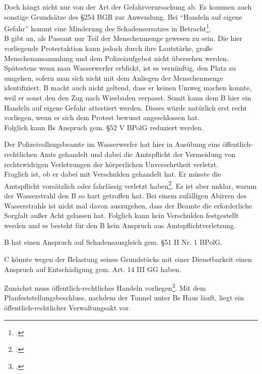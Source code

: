 \documentclass[widefront, ngerman]{jura}
\begin{document}
Doch hängt nicht nur von der Art der Gefahrverursachung ab. Es kommen auch sonstige Grundsätze des §254 BGB zur Anwendung. Bei "`Handeln auf eigene Gefahr"' kommt eine Minderung des Schadensersatzes in Betracht\footcite[§254 Rn 62]{Staudinger254}.\\
B gibt an, als Passant nur Teil der Menschenmenge gewesen zu sein. Die hier vorliegende Protestaktion kann jedoch durch ihre Lautstärke, große Menschenansammlung und dem Polizeiaufgebot nicht übersehen werden. Spätestens wenn man Wasserwerfer erblickt, ist es vernünftig, den Platz zu umgehen, sofern man sich nicht mit dem Anliegen der Menschenmenge identifiziert. B macht auch nicht geltend, dass er keinen Umweg machen konnte, weil er sonst den den Zug nach Wiesbaden verpasst. Somit kann dem B hier ein Handeln auf eigene Gefahr attestiert werden. Dieses würde natürlich erst recht vorliegen, wenn er sich dem Protest bewusst angeschlossen hat.\\
Folglich kann Bs Anspruch gem. §52 V BPolG reduziert werden.


\levelup {}
Der Polizeivollzugsbeamte im Wasserwerfer hat hier in Ausübung eins öffentlich-rechtlichen Amts gehandelt und dabei die Amtspflicht der Vermeidung von rechtswidrigen Verletzungen der körperlichen Unversehrtheit verletzt.\\
Fraglich ist, ob er dabei mit Verschulden gehandelt hat. Er müsste die Amtspflicht vorsätzlich oder fahrlässig verletzt haben\footcite[Rachor][L Rn 91]{HandbuchPolizeirecht}. Es ist aber unklar, warum der Wasserstrahl den B so hart getroffen hat. Bei einem zufälligen Abirren des Wasserstrahls ist nicht mal davon auszugehen, dass der Beamte die erforderliche Sorgfalt außer Acht gelassen hat. Folglich kann kein Verschulden festgestellt werden und es besteht für den B kein Anspruch aus Amtspflichtverletzung.

B hat einen Anspruch auf Schadensausgleich gem. §51 II Nr. 1 BPolG.

\levelup{}

C könnte wegen der Belastung seines Grundstücks mit einer Dienst\-bar\-keit einen Anspruch auf Entschädigung gem. Art. 14 III GG haben.

Zunächst muss öffentlich-rechtliches Handeln vorliegen\footcite[Rn 1112]{detterbeckVerwR}. Mit dem Planfeststellungsbeschluss, nachdem der Tunnel unter Bs Haus läuft, liegt ein öffentlich-rechtlicher Verwaltungsakt vor.
\end{document}
